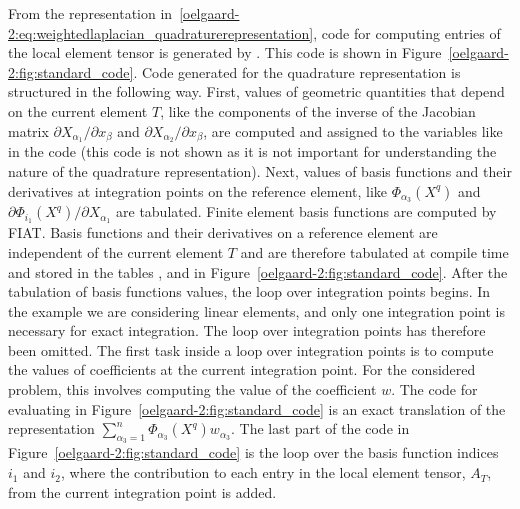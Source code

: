 From the representation
in~\eqref{oelgaard-2:eq:weightedlaplacian_quadraturerepresentation},
code for computing entries of the local element tensor is generated by
\ffc{}. This code is shown in
Figure~\ref{oelgaard-2:fig:standard_code}.  Code generated for the
quadrature representation is structured in the following way.  First,
values of geometric quantities that depend on the current element $T$,
like the components of the inverse of the Jacobian matrix $\partial
X_{\alpha_1} / \partial x_{\beta}$ and $\partial X_{\alpha_2}
/ \partial x_{\beta}$, are computed and assigned to the variables like
 in the code (this code is not shown as it is not important
for understanding the nature of the quadrature representation).  Next,
values of basis functions and their derivatives at integration points
on the reference element, like $\Phi_{\alpha_{3}}(X^q)$ and $\partial
\Phi_{i_1}(X^q) / \partial X_{\alpha_1}$ are tabulated.  Finite
element basis functions are computed by FIAT.  Basis functions and
their derivatives on a reference element are independent of the
current element $T$ and are therefore tabulated at compile time and
stored in the tables ,  and
 in Figure~\ref{oelgaard-2:fig:standard_code}.
After the tabulation of basis functions values, the loop over
integration points begins.  In the example we are considering linear
elements, and only one integration point is necessary for exact
integration. The loop over integration points has therefore been
omitted.  The first task inside a loop over integration points is to
compute the values of coefficients at the current integration point.
For the considered problem, this involves computing the value of the
coefficient $w$.  The code for evaluating  in
Figure~\ref{oelgaard-2:fig:standard_code} is an exact translation of
the representation $\sum_{\alpha_{3}=1}^n \Phi_{\alpha_{3}}(X^q)
w_{\alpha_{3}}$.  The last part of the code in
Figure~\ref{oelgaard-2:fig:standard_code} is the loop over the basis
function indices $i_{1}$ and $i_{2}$, where the contribution to each
entry in the local element tensor, $A_{T}$, from the current
integration point is added.

